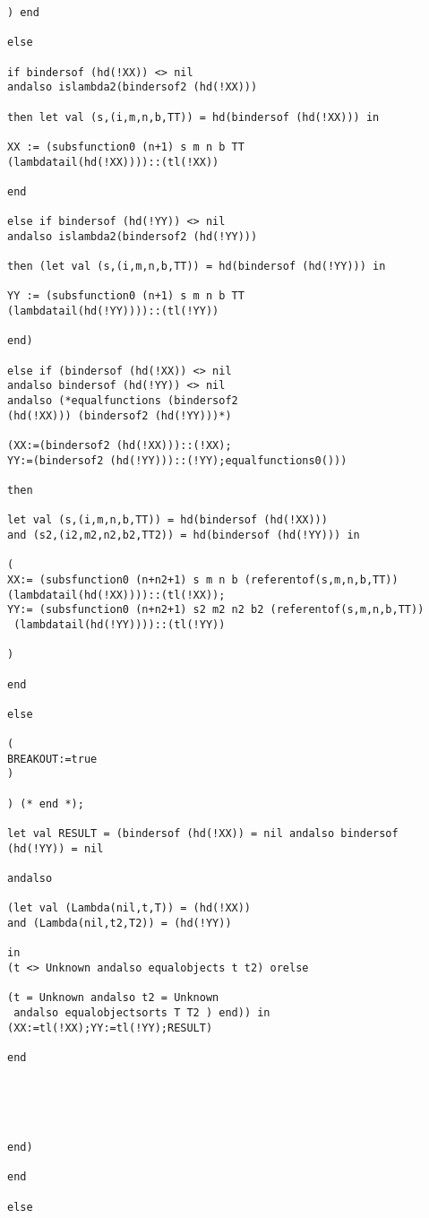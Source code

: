 \documentclass[12pt]{article}
\begin{document}
\begin{verbatim}
) end

else

if bindersof (hd(!XX)) <> nil 
andalso islambda2(bindersof2 (hd(!XX)))

then let val (s,(i,m,n,b,TT)) = hd(bindersof (hd(!XX))) in

XX := (subsfunction0 (n+1) s m n b TT 
(lambdatail(hd(!XX))))::(tl(!XX))

end

else if bindersof (hd(!YY)) <> nil 
andalso islambda2(bindersof2 (hd(!YY)))

then (let val (s,(i,m,n,b,TT)) = hd(bindersof (hd(!YY))) in

YY := (subsfunction0 (n+1) s m n b TT 
(lambdatail(hd(!YY))))::(tl(!YY))

end)

else if (bindersof (hd(!XX)) <> nil 
andalso bindersof (hd(!YY)) <> nil 
andalso (*equalfunctions (bindersof2 
(hd(!XX))) (bindersof2 (hd(!YY)))*) 

(XX:=(bindersof2 (hd(!XX)))::(!XX);
YY:=(bindersof2 (hd(!YY)))::(!YY);equalfunctions0()))

then

let val (s,(i,m,n,b,TT)) = hd(bindersof (hd(!XX)))
and (s2,(i2,m2,n2,b2,TT2)) = hd(bindersof (hd(!YY))) in

(
XX:= (subsfunction0 (n+n2+1) s m n b (referentof(s,m,n,b,TT)) 
(lambdatail(hd(!XX))))::(tl(!XX));
YY:= (subsfunction0 (n+n2+1) s2 m2 n2 b2 (referentof(s,m,n,b,TT))
 (lambdatail(hd(!YY))))::(tl(!YY))

)

end

else

(
BREAKOUT:=true
)

) (* end *);

let val RESULT = (bindersof (hd(!XX)) = nil andalso bindersof (hd(!YY)) = nil

andalso

(let val (Lambda(nil,t,T)) = (hd(!XX))
and (Lambda(nil,t2,T2)) = (hd(!YY))

in
(t <> Unknown andalso equalobjects t t2) orelse

(t = Unknown andalso t2 = Unknown
 andalso equalobjectsorts T T2 ) end)) in (XX:=tl(!XX);YY:=tl(!YY);RESULT) 

end





end)

end

else


\end{verbatim}
\end{document}
